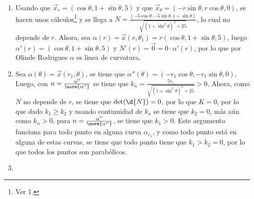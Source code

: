 \documentclass{homework}
\begin{document}
\begin{sol}
    \begin{enumerate}
        \item Usando que \(\vec{x}_r=(\cos\theta,1+\sin\theta,5)\) y que \(\vec{x}_\theta=(-r\sin\theta,r\cos\theta,0)\), se hacen unos cálculos\footnote{Ver 1.} y se llega a \(N=\frac{(-5\cos\theta,-5\sin\theta,1+\sin\theta)}{\sqrt{(1+\sin^2\theta)^2+25}}\), lo cual no depende de \(r\). Ahora, sea \(\alpha(r)=\vec{x}(r,\theta_1)=r(\cos\theta,1+\sin\theta,5)\), luego \(\alpha'(r)=(\cos\theta,1+\sin\theta,5)\) y \(N'(r)=\vec{0}=0\cdot\alpha'(r)\), por lo que por Olinde Rodrigues \(\alpha\) es linea de curvatura.
        \item Sea \(\alpha(\theta)=\vec{x}(r_1,\theta)\), se tiene que \(\alpha''(\theta)=(-r_1\cos\theta,-r_1\sin\theta,0)\). Luego, con \(n=\frac{\alpha''}{\norm{\alpha''}}\) se tiene que \(k_n=\frac{5r_1}{\sqrt{(1+\sin^2\theta)^2+25}}>0\). Ahora, como \(N\) no depende de \(r\), se tiene que \(\det(\d{N})=0\), por lo que \(K=0\), por lo que dado \(k_1\geq k_2\) y usando continuidad de \(k_n\) se tiene que \(k_2=0\), más aún como \(k_n>0\), para \(n=\frac{\alpha''}{\norm{\alpha''}}\), se tiene que \(k_1>0\). Este argumento funciona para todo punto en alguna curva \(\alpha_{r_1}\), y como todo punto está en alguna de estas curvas, se tiene que todo punto tiene que \(k_1>k_2=0\), por lo que todos los puntos son parabólicos.
        \item 
    \end{enumerate}
\end{sol}
\end{document}
